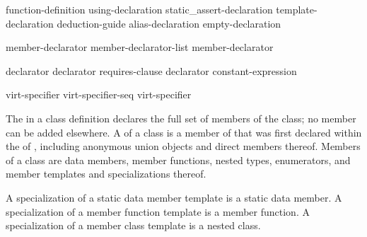 \begin{bnf}
\br
       \terminal{;}\br
    function-definition\br
    using-declaration\br
    static_assert-declaration\br
    template-declaration\br
    deduction-guide\br
    alias-declaration\br
    empty-declaration
\end{bnf}

\begin{bnf}
\br
    member-declarator\br
    member-declarator-list \terminal{,} member-declarator
\end{bnf}

\begin{bnf}
\br
    declarator  \br
    declarator requires-clause\br
    declarator \br
      \terminal{:} constant-expression 
\end{bnf}

\begin{bnf}
\br
    virt-specifier\br
    virt-specifier-seq virt-specifier
\end{bnf}

\begin{bnf}
\br
    \br
\end{bnf}

\begin{bnf}
\br
\end{bnf}

\pnum
{}%
The  in a class definition declares the
full set of members of the class; no member can be added elsewhere.
A  of a class  is a member of 
that was first declared within the  of ,
including anonymous union objects and direct members thereof.
Members of a class are data members, member
functions, nested types, enumerators,
and member templates and specializations thereof.
\begin{note}
A specialization of a static data member template is a static data member.
A specialization of a member function template is a member function.
A specialization of a member class template is a nested class.
\end{note}

